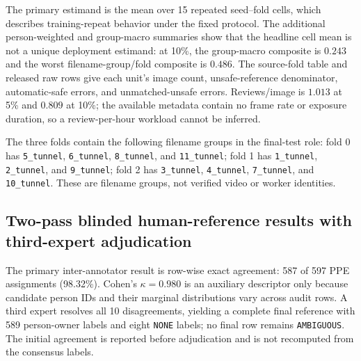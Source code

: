 \documentclass[iicol,pdflatex,sn-mathphys-num]{sn-jnl}
\begin{document}
The primary estimand is the mean over 15 repeated seed--fold cells, which describes training-repeat behavior under the fixed protocol. The additional person-weighted and group-macro summaries show that the headline cell mean is not a unique deployment estimand: at 10\%, the group-macro composite is $0.243$ and the worst filename-group/fold composite is $0.486$. The source-fold table and released raw rows give each unit's image count, unsafe-reference denominator, automatic-safe errors, and unmatched-unsafe errors. Reviews/image is $1.013$ at 5\% and $0.809$ at 10\%; the available metadata contain no frame rate or exposure duration, so a review-per-hour workload cannot be inferred.

The three folds contain the following filename groups in the final-test role: fold 0 has \texttt{5\_tunnel}, \texttt{6\_tunnel}, \texttt{8\_tunnel}, and \texttt{11\_tunnel}; fold 1 has \texttt{1\_tunnel}, \texttt{2\_tunnel}, and \texttt{9\_tunnel}; fold 2 has \texttt{3\_tunnel}, \texttt{4\_tunnel}, \texttt{7\_tunnel}, and \texttt{10\_tunnel}. These are filename groups, not verified video or worker identities.

\subsection{Two-pass blinded human-reference results with third-expert adjudication}\label{sec:humanresults}

The primary inter-annotator result is row-wise exact agreement: 587 of 597 PPE assignments (98.32\%). Cohen's $\kappa=0.980$ is an auxiliary descriptor only because candidate person IDs and their marginal distributions vary across audit rows. A third expert resolves all 10 disagreements, yielding a complete final reference with 589 person-owner labels and eight \texttt{NONE} labels; no final row remains \texttt{AMBIGUOUS}. The initial agreement is reported before adjudication and is not recomputed from the consensus labels.
\end{document}
